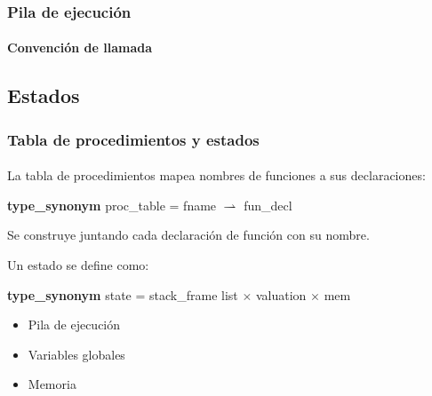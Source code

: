 \begin{frame}[fragile]
\frametitle{Pila de ejecución}
\framesubtitle{Convención de llamada}


\begin{semiverbatim}
\end{semiverbatim}


\end{frame}

\subsection{Estados}

\begin{frame}
\frametitle{Tabla de procedimientos y estados}
\framesubtitle{}

La tabla de procedimientos mapea nombres de funciones a sus declaraciones:
\bigskip

\textbf{type\_synonym} proc\_table = fname $\rightharpoonup$ fun\_decl
\pause
\bigskip

Se construye juntando cada declaración de función con su nombre.

\pause
\bigskip

Un estado se define como:
\bigskip
\pause

\textbf{type\_synonym} state = stack\_frame list $\times$ valuation $\times$ mem

\pause

\begin{itemize}
\item{Pila de ejecución}
\item{Variables globales}
\item{Memoria}
\end{itemize}

\end{frame}


